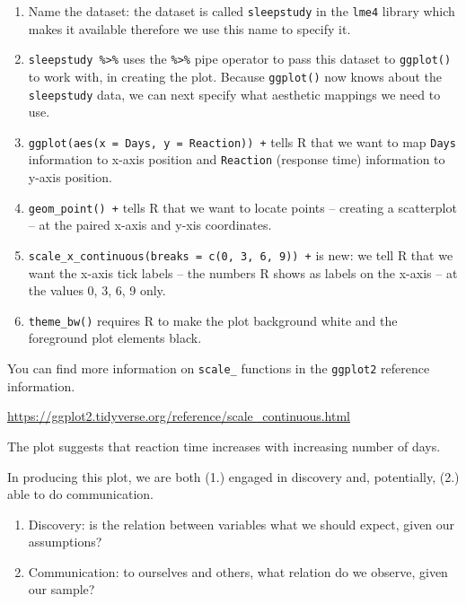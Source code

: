 \documentclass[
  letterpaper,
  DIV=11,
  numbers=noendperiod]{scrreprt}
\providecommand{\tightlist}{%
  \setlength{\itemsep}{0pt}\setlength{\parskip}{0pt}}\usepackage{longtable,booktabs,array}
\begin{document}
\begin{enumerate}
\def\labelenumi{\arabic{enumi}.}
\tightlist
\item
  Name the dataset: the dataset is called \texttt{sleepstudy} in the
  \texttt{lme4} library which makes it available therefore we use this
  name to specify it.
\item
  \texttt{sleepstudy\ \%\textgreater{}\%} uses the
  \texttt{\%\textgreater{}\%} pipe operator to pass this dataset to
  \texttt{ggplot()} to work with, in creating the plot. Because
  \texttt{ggplot()} now knows about the \texttt{sleepstudy} data, we can
  next specify what aesthetic mappings we need to use.
\item
  \texttt{ggplot(aes(x\ =\ Days,\ y\ =\ Reaction))\ +} tells R that we
  want to map \texttt{Days} information to x-axis position and
  \texttt{Reaction} (response time) information to y-axis position.
\item
  \texttt{geom\_point()\ +} tells R that we want to locate points --
  creating a scatterplot -- at the paired x-axis and y-xis coordinates.
\item
  \texttt{scale\_x\_continuous(breaks\ =\ c(0,\ 3,\ 6,\ 9))\ +} is new:
  we tell R that we want the x-axis tick labels -- the numbers R shows
  as labels on the x-axis -- at the values 0, 3, 6, 9 only.
\item
  \texttt{theme\_bw()} requires R to make the plot background white and
  the foreground plot elements black.
\end{enumerate}

You can find more information on \texttt{scale\_} functions in the
\texttt{ggplot2} reference information.

\url{https://ggplot2.tidyverse.org/reference/scale_continuous.html}

The plot suggests that reaction time increases with increasing number of
days.

In producing this plot, we are both (1.) engaged in discovery and,
potentially, (2.) able to do communication.

\begin{enumerate}
\def\labelenumi{\arabic{enumi}.}
\tightlist
\item
  Discovery: is the relation between variables what we should expect,
  given our assumptions?
\item
  Communication: to ourselves and others, what relation do we observe,
  given our sample?
\end{enumerate}
\end{document}
